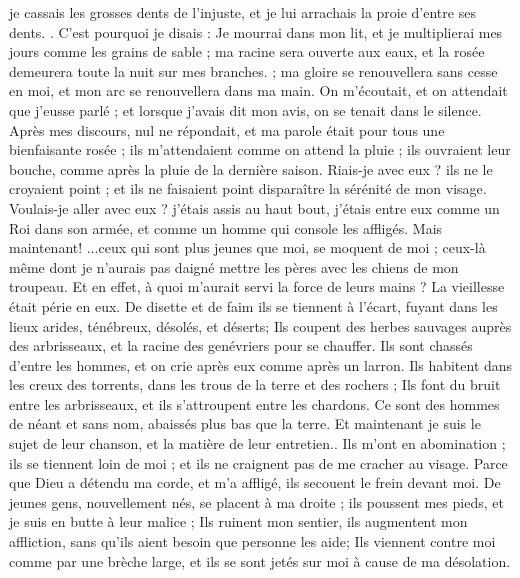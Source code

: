 \begin{multicols}{2}
je cassais les grosses dents de l'injuste, et je lui arrachais la proie d'entre ses dents. .
C'est pourquoi je disais : Je mourrai dans mon  lit, et je multiplierai mes jours comme les grains de sable ;
ma racine sera ouverte aux eaux, et la rosée demeurera toute la nuit sur mes branches. ;
ma gloire se renouvellera sans cesse en moi, et mon arc se renouvellera dans ma main.
On m'écoutait, et on attendait que j'eusse parlé ; et lorsque j'avais dit mon avis, on se tenait dans le silence.
Après mes discours, nul ne répondait, et ma parole était pour tous une bienfaisante rosée ;
ils m'attendaient comme on attend la pluie ; ils ouvraient leur bouche, comme après la pluie de la dernière saison.
Riais-je avec eux ? ils ne le croyaient point ; et ils ne faisaient point disparaître la sérénité de mon visage.
Voulais-je aller avec eux ? j'étais assis au haut bout, j'étais entre eux comme un Roi dans son armée, et comme un homme qui console les affligés.
\VerseOne{}Mais maintenant! ...ceux qui sont plus jeunes que moi, se moquent de moi ; ceux-là même dont je n'aurais pas daigné mettre les pères avec les chiens de mon troupeau.
Et en effet, à quoi m'aurait servi la force de leurs mains ? La vieillesse était périe en eux. 
De disette et de faim ils se tiennent à l'écart, fuyant dans les lieux arides, ténébreux, désolés, et déserts;
Ils coupent des herbes sauvages auprès des arbrisseaux, et la racine des genévriers pour se chauffer. 
Ils sont chassés d'entre les hommes, et on crie après eux comme après un larron. 
Ils habitent dans les creux des torrents, dans les trous de la terre et des rochers ;
Ils font du bruit entre les arbrisseaux, et ils s'attroupent entre les chardons. 
Ce sont des hommes de néant et sans nom, abaissés plus bas que la terre. 
Et maintenant je suis le sujet de leur chanson, et la matière de leur entretien..
Ils m'ont en abomination ; ils se tiennent loin de moi ; et ils ne craignent pas de me cracher au visage. 
Parce que Dieu a détendu ma corde, et m'a affligé, ils secouent le frein devant moi.
De jeunes gens, nouvellement nés, se placent à ma droite ; ils poussent mes pieds, et je suis en butte à leur malice ;
Ils ruinent mon sentier, ils augmentent mon affliction, sans qu'ils aient besoin que personne les aide;
Ils viennent contre moi comme par une brèche large, et ils se sont jetés sur moi à cause de ma désolation. 

\end{multicols}

